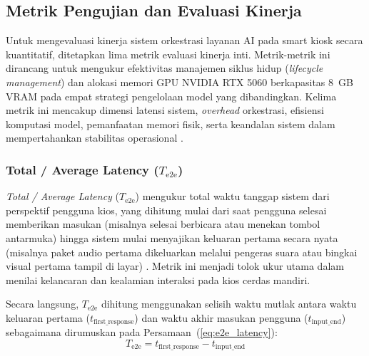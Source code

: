
\subsection{Metrik Pengujian dan Evaluasi Kinerja}
\label{subsec:metrik_evaluasi}

Untuk mengevaluasi kinerja sistem orkestrasi layanan AI pada smart kiosk secara kuantitatif, ditetapkan lima metrik evaluasi kinerja inti. Metrik-metrik ini dirancang untuk mengukur efektivitas manajemen siklus hidup (\textit{lifecycle management}) dan alokasi memori GPU NVIDIA RTX 5060 berkapasitas 8~GB VRAM pada empat strategi pengelolaan model yang dibandingkan. Kelima metrik ini mencakup dimensi latensi sistem, \textit{overhead} orkestrasi, efisiensi komputasi model, pemanfaatan memori fisik, serta keandalan sistem dalam mempertahankan stabilitas operasional \cite{zhang2025adaptive, woo2025exploring, min2023sensix}.

\subsubsection{Total / Average Latency ($T_{\text{e2e}}$)}
\textit{Total / Average Latency} ($T_{\text{e2e}}$) mengukur total waktu tanggap sistem dari perspektif pengguna kios, yang dihitung mulai dari saat pengguna selesai memberikan masukan (misalnya selesai berbicara atau menekan tombol antarmuka) hingga sistem mulai menyajikan keluaran pertama secara nyata (misalnya paket audio pertama dikeluarkan melalui pengeras suara atau bingkai visual pertama tampil di layar) \cite{chen2022minideep, chiang2023management}. Metrik ini menjadi tolok ukur utama dalam menilai kelancaran dan kealamian interaksi pada kios cerdas mandiri.

Secara langsung, $T_{\text{e2e}}$ dihitung menggunakan selisih waktu mutlak antara waktu keluaran pertama ($t_{\text{first\_response}}$) dan waktu akhir masukan pengguna ($t_{\text{input\_end}}$) sebagaimana dirumuskan pada Persamaan~(\ref{eq:e2e_latency}):
\begin{equation}
    T_{\text{e2e}} = t_{\text{first\_response}} - t_{\text{input\_end}}
    \label{eq:e2e_latency}
\end{equation}


